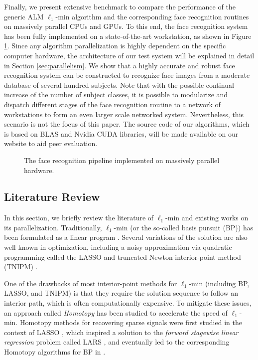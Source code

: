 \documentclass[10pt,twocolumn,letterpaper]{article}
\begin{document}
Finally, we present extensive benchmark to compare the performance of the generic ALM $\ell_1$-min algorithm and the corresponding face recognition routines on massively parallel CPUs and GPUs. 
To this end, the face recognition system has been fully implemented on a state-of-the-art workstation, as shown in Figure \ref{fig:pipeline}. Since any algorithm parallelization is highly dependent on the specific computer hardware, the architecture of our test system will be explained in detail in Section \ref{sec:parallelism}.
We show that a highly accurate and robust face recognition system can be constructed to recognize face images from a moderate database of several hundred subjects. Note that with the possible continual increase of the number of subject classes, it is possible to modularize and dispatch different stages of the face recognition routine to a network of workstations to form an even larger scale networked system. Nevertheless, this scenario is not the focus of this paper. The source code of our algorithms, which is based on BLAS and Nvidia CUDA libraries, will be made available on our website to aid peer evaluation.
\begin{figure}
\centering
{\tiny }
\caption{The face recognition pipeline implemented on massively parallel hardware.}
\label{fig:pipeline}
\end{figure}

\subsection{Literature Review}
In this section, we briefly review the literature of $\ell_1$-min and existing works on its parallelization. Traditionally, $\ell_1$-min (or the so-called basis pursuit (BP)) has been formulated as a linear program \cite{ChenS2001-SIAM}. Several variations of the solution are also well known in optimization, including a noisy approximation via quadratic programming called the LASSO \cite{TibshiraniR1996} and truncated Newton interior-point method (TNIPM) \cite{KimS2007}.

One of the drawbacks of most interior-point methods for $\ell_1$-min (including BP, LASSO, and TNIPM) is that they require the solution sequence to follow an interior path, which is often computationally expensive. To mitigate these issues, an approach called \emph{Homotopy} has been studied to accelerate the speed of $\ell_1$-min. Homotopy methods for recovering sparse signals were first studied in the context of LASSO \cite{OsborneM2000}, which inspired a solution to the \emph{forward stagewise linear regression} problem called LARS \cite{EfronB2004}, and eventually led to the corresponding Homotopy algorithms for BP in \cite{MalioutovD2005,DonohoD2006}.
\end{document}
